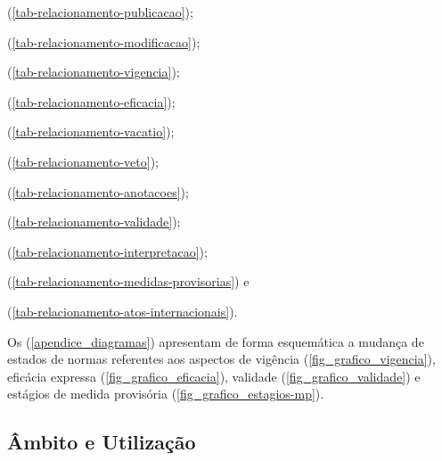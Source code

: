 \documentclass[a4paper,11pt,openright,twoside,english,brazil]{abntex2}
\begin{document}
\begin{alineas}
 \item {}
 (\autoref{tab-relacionamento-publicacao});

 \item {}
 (\autoref{tab-relacionamento-modificacao});

 \item {}
 (\autoref{tab-relacionamento-vigencia});

 \item {}
 (\autoref{tab-relacionamento-eficacia});

 \item {}
 (\autoref{tab-relacionamento-vacatio});

 \item {} (\autoref{tab-relacionamento-veto});

 \item {}
 (\autoref{tab-relacionamento-anotacoes});

 \item {}
 (\autoref{tab-relacionamento-validade});

 \item {}
 (\autoref{tab-relacionamento-interpretacao});

 \item {}
 (\autoref{tab-relacionamento-medidas-provisorias}) e

 \item {}
 (\autoref{tab-relacionamento-atos-internacionais}).
  
\end{alineas}

Os  (\autoref{apendice_diagramas}) apresentam de
forma esquemática a mudança de estados de normas referentes aos aspectos de
vigência (\autoref{fig_grafico_vigencia}), eficácia expressa
(\autoref{fig_grafico_eficacia}), validade (\autoref{fig_grafico_validade}) e
estágios de medida provisória (\autoref{fig_grafico_estagios-mp}).

\subsection{Âmbito e Utilização}
\end{document}
